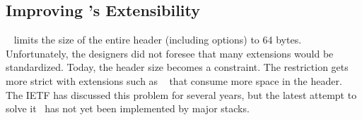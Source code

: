 \subsection{Improving \tcp's Extensibility}


\tcp~\cite{rfc793} limits the size of the entire \tcp header (including options) to 64 bytes. Unfortunately, the \tcp designers did not foresee that many \tcp extensions would be standardized. Today, the \tcp header size becomes a constraint.
The restriction gets more strict with extensions such as \mptcp~\cite{rfc6824} that consume more space in the \tcp header. The IETF has discussed this problem for several years, but the latest attempt to solve it~\cite{draft-ietf-tcpm-tcp-edo-10} has not yet been implemented by major \tcp stacks.
%
%

